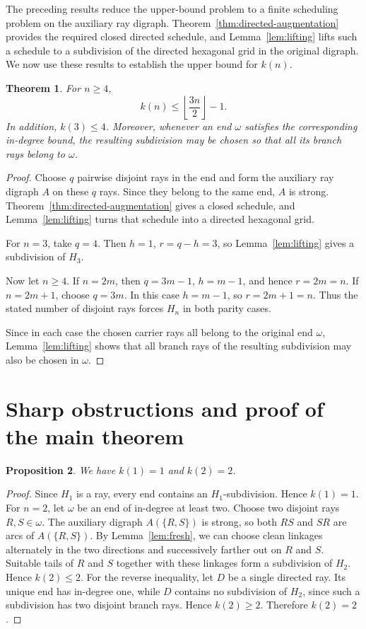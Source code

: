 \documentclass[11pt]{article}
\newtheorem{theorem}{Theorem}[section]
\newtheorem{proposition}[theorem]{Proposition}
\theoremstyle{remark}
\numberwithin{equation}{section}
\begin{document}
The preceding results reduce the upper-bound problem to a finite scheduling problem on the auxiliary ray digraph. Theorem~\ref{thm:directed-augmentation} provides the required closed directed schedule, and Lemma~\ref{lem:lifting} lifts such a schedule to a subdivision of the directed hexagonal grid in the original digraph. We now use these results to establish the upper bound for $k(n)$.


\begin{theorem}\label{thm:upper}
For $n\ge4$,
\[
k(n)\le\left\lfloor\frac{3n}{2}\right\rfloor-1.
\]
In addition, $k(3)\le4$. Moreover, whenever an end $\omega$ satisfies the corresponding in-degree bound, the resulting subdivision may be chosen so that all its branch rays belong to $\omega$.
\end{theorem}

\begin{proof}
Choose $q$ pairwise disjoint rays in the end and form the auxiliary ray digraph $A$ on these $q$ rays. Since they belong to the same end, $A$ is strong. Theorem~\ref{thm:directed-augmentation} gives a closed schedule, and Lemma~\ref{lem:lifting} turns that schedule into a directed hexagonal grid.

For $n=3$, take $q=4$. Then $h=1$, $r=q-h=3$, so Lemma~\ref{lem:lifting} gives a subdivision of $H_3$.

Now let $n\ge4$. If $n=2m$, then $q=3m-1$, $h=m-1$, and hence $r=2m=n$. If $n=2m+1$, choose $q=3m$. In this case $h=m-1$, so $r=2m+1=n$. Thus the stated number of disjoint rays forces $H_n$ in both parity cases.

Since in each case the chosen carrier rays all belong to the original end $\omega$, Lemma~\ref{lem:lifting} shows that all branch rays of the resulting subdivision may also be chosen in $\omega$.
\end{proof}

\section{Sharp obstructions and proof of the main theorem}

\begin{proposition}\label{prop:small12}
We have $k(1)=1$ and $k(2)=2$.
\end{proposition}

\begin{proof}
Since $H_1$ is a ray, every end contains an $H_1$-subdivision. Hence $k(1)=1$.
For $n=2$, let $\omega$ be an end of in-degree at least two. Choose two disjoint rays $R,S\in\omega$. The auxiliary digraph $A(\{R,S\})$ is strong, so both $RS$ and $SR$ are arcs of $A(\{R,S\})$. By Lemma~\ref{lem:fresh}, we can choose clean linkages alternately in the two directions and successively farther out on $R$ and $S$. Suitable tails of $R$ and $S$ together with these linkages form a subdivision of $H_2$. Hence $k(2)\le2$. For the reverse inequality, let $D$ be a single directed ray. Its unique end has in-degree one, while $D$ contains no subdivision of $H_2$, since such a subdivision has two disjoint branch rays. Hence $k(2)\ge2$. Therefore $k(2)=2$.
\end{proof}
\end{document}
